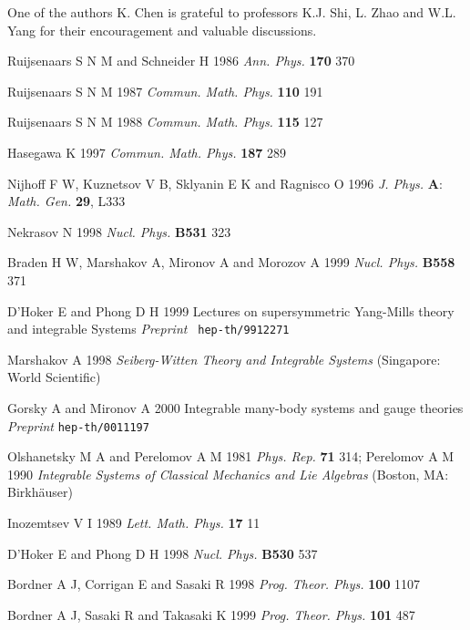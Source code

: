 \documentclass[a4paper,12pt]{article}
\begin{document}
One of the authors K. Chen is grateful to professors K.J. Shi, L. Zhao and
W.L. Yang for their encouragement and valuable discussions.

\vspace{1pt}

\vspace{1pt}

\begin{thebibliography}{99}
  Ruijsenaars S N M and Schneider H 1986 \textit{Ann. Phys.}
\textbf{170} 370

  Ruijsenaars S N M 1987 \textit{Commun. Math. Phys.} \textbf{%
110 } 191

  Ruijsenaars S N M 1988 \textit{Commun. Math. Phys.} \textbf{%
115 } 127

  Hasegawa K 1997 \textit{Commun. Math. Phys.} \textbf{187} 289

  Nijhoff F W, Kuznetsov V B, Sklyanin E K and Ragnisco O 1996
\textit{J. Phys.} \textbf{A}: \textit{Math. Gen.} \textbf{29}, L333

  Nekrasov N 1998 \textit{Nucl. Phys.} \textbf{B531} 323

  Braden H W, Marshakov A, Mironov A and Morozov A 1999
\textit{Nucl. Phys. }\textbf{B558} 371

  D'Hoker E and Phong D H 1999 Lectures on supersymmetric
Yang-Mills theory and integrable Systems \textit{Preprint }\texttt{\
hep-th/9912271}

  Marshakov A 1998 \textit{Seiberg-Witten Theory and
Integrable Systems} (Singapore: World Scientific)

  Gorsky A and Mironov A 2000 Integrable many-body systems and
gauge theories \textit{Preprint} \texttt{hep-th/0011197}

  Olshanetsky M A and Perelomov A M 1981 \textit{Phys. Rep.}
\textbf{71} 314; Perelomov A M 1990 \textit{Integrable Systems of Classical
Mechanics and Lie Algebras} (Boston, MA: Birkh\"{a}user)

  Inozemtsev V I 1989 \textit{Lett. Math. Phys.} \textbf{17} 11

  D'Hoker E and Phong D H 1998 \textit{Nucl. Phys.} \textbf{%
B530 } 537

  Bordner A J, Corrigan E and Sasaki R 1998 \textit{Prog.
Theor. Phys. }\textbf{100} 1107

  Bordner A J, Sasaki R and Takasaki K 1999 \textit{Prog.
Theor. Phys.} \textbf{101} 487


\end{thebibliography}
\end{document}
